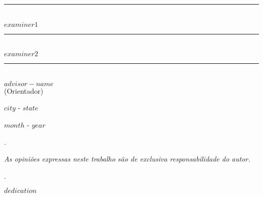 \begin{minipage}{0.45\textwidth}
    \centering
    \rule{6cm}{0.4pt} \\
    $examiner1$
\end{minipage}%
\hspace{0.1\textwidth}
\begin{minipage}{0.45\textwidth}
    \centering
    \rule{6cm}{0.4pt} \\
    $examiner2$
\end{minipage}

\vspace{2.0cm}

\centering
\rule{6cm}{0.4pt} \\
$advisor-name$ \\
(Orientador)

\vspace{2.0cm}

\begin{center}

$city$ - $state$

$month$ - $year$
    
\end{center}

\newpage
\thispagestyle{empty}

\begin{invisible}
.
\end{invisible}

\vspace{28\baselineskip}

\textit{As opiniões expressas neste trabalho são de exclusiva responsabilidade do autor.}


\newpage
\pagestyle{fancy}

\begin{invisible}
.
\end{invisible}

\vspace{28\baselineskip}

\begin{adjustwidth}{7.5cm}{0cm}
    \justifying
    \singlespacing
    $dedication$
\end{adjustwidth}

\newpage
\pagestyle{fancy}

\newcommand{\resumo}{%
\titleformat{\section}[block]{\bfseries\filcenter}{}{1em}{}
}
\resumo

